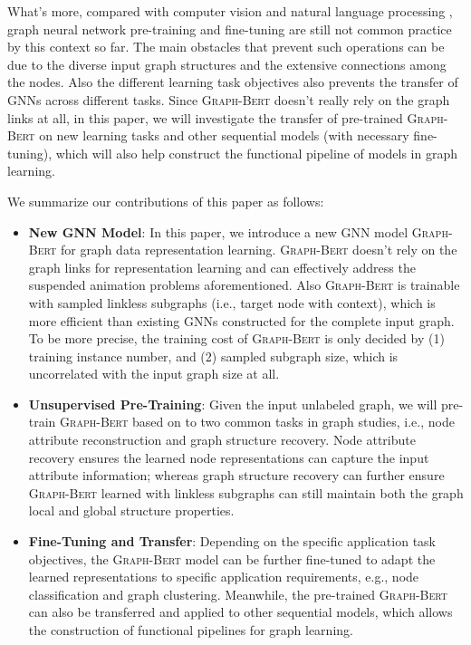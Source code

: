 \documentclass{article}
\newcommand{\our}{\textsc{Graph-Bert}}
\begin{document}
What's more, compared with computer vision \cite{DBLP:journals/corr/abs-1811-08883} and natural language processing \cite{DCLT18}, graph neural network pre-training and fine-tuning are still not common practice by this context so far. The main obstacles that prevent such operations can be due to the diverse input graph structures and the extensive connections among the nodes. Also the different learning task objectives also prevents the transfer of GNNs across different tasks. Since {\our} doesn't really rely on the graph links at all, in this paper, we will investigate the transfer of pre-trained {\our} on new learning tasks and other sequential models (with necessary fine-tuning), which will also help construct the functional pipeline of models in graph learning.

We summarize our contributions of this paper as follows:
\begin{itemize}

\item \textbf{New GNN Model}: In this paper, we introduce a new GNN model {\our} for graph data representation learning. {\our} doesn't rely on the graph links for representation learning and can effectively address the suspended animation problems aforementioned. Also {\our} is trainable with sampled linkless subgraphs (i.e., target node with context), which is more efficient than existing GNNs constructed for the complete input graph. To be more precise, the training cost of {\our} is only decided by (1) training instance number, and (2) sampled subgraph size, which is uncorrelated with the input graph size at all.

\item \textbf{Unsupervised Pre-Training}: Given the input unlabeled graph, we will pre-train {\our} based on to two common tasks in graph studies, i.e., node attribute reconstruction and graph structure recovery. Node attribute recovery ensures the learned node representations can capture the input attribute information; whereas graph structure recovery can further ensure {\our} learned with linkless subgraphs can still maintain both the graph local and global structure properties. 

\item \textbf{Fine-Tuning and Transfer}: Depending on the specific application task objectives, the {\our} model can be further fine-tuned to adapt the learned representations to specific application requirements, e.g., node classification and graph clustering. Meanwhile, the pre-trained {\our} can also be transferred and applied to other sequential models, which allows the construction of functional pipelines for graph learning.

\end{itemize}
\end{document}
